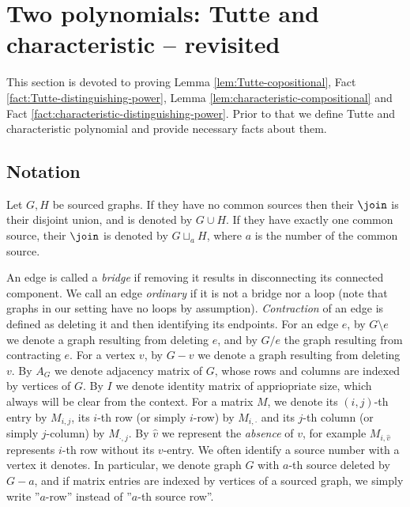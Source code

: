 \section{Two polynomials: Tutte and characteristic -- revisited}
This section is devoted to proving Lemma \ref{lem:Tutte-copositional}, Fact \ref{fact:Tutte-distinguishing-power}, Lemma \ref{lem:characteristic-compositional} and Fact \ref{fact:characteristic-distinguishing-power}. Prior to that we define Tutte and characteristic polynomial and provide necessary facts about them.
\subsection{Notation}
Let $G,H$ be sourced graphs. If they have no common sources then their $\join$ is their disjoint union, and is denoted by $G\cup H$. If they have exactly one common source, their $\join$ is denoted by $G\sqcup_a H$, where $a$ is the number of the common source. 

An edge is called a \emph{bridge} if removing it results in disconnecting its connected component. We call an edge \emph{ordinary} if it is not a bridge nor a loop (note that graphs in our setting have no loops by assumption). \emph{Contraction} of an edge is defined as deleting it and then identifying its endpoints. For an edge $e$, by $G \setminus e$ we denote a graph resulting from deleting $e$, and by $G/e$ the graph resulting from contracting $e$. For a vertex $v$, by $G-v$ we denote a graph resulting from deleting $v$. By $A_G$ we denote adjacency matrix of $G$, whose rows and columns are indexed by vertices of $G$. By $I$ we denote identity matrix of appriopriate size, which always will be clear from the context. For a matrix $M$, we denote its $(i,j)$-th entry by $M_{i,j}$, its $i$-th row (or simply $i$-row) by $M_{i,\cdot}$ and its $j$-th column (or simply $j$-column) by $M_{\cdot, j}$. By $\widehat{v}$ we represent the \emph{absence} of $v$, for example $M_{i, \widehat{v}}$ represents $i$-th row without its $v$-entry.
We often identify a source number with a vertex it denotes. In particular, we denote graph $G$ with $a$-th source deleted by $G-a$, and if matrix entries are indexed by vertices of a sourced graph, we simply write ''$a$-row'' instead of ''$a$-th source row''.
